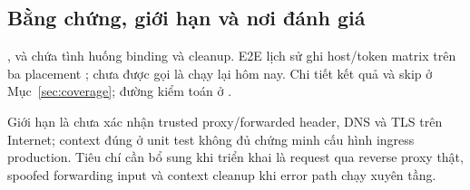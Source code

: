 \subsection{Bằng chứng, giới hạn và nơi đánh giá}
,  và  chứa tình huống binding và cleanup. E2E lịch sử ghi host\slash token matrix trên ba placement ; chưa được gọi là chạy lại hôm nay. Chi tiết kết quả và skip ở Mục~\ref{sec:coverage}; đường kiểm toán ở .

Giới hạn là chưa xác nhận trusted proxy\slash forwarded header, DNS và TLS trên Internet; context đúng ở unit test không đủ chứng minh cấu hình ingress production. Tiêu chí cần bổ sung khi triển khai là request qua reverse proxy thật, spoofed forwarding input và context cleanup khi error path chạy xuyên tầng.
